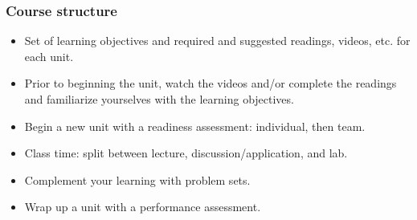 \documentclass[11pt]{beamer}
\begin{document}

\begin{frame}
\frametitle{Course structure}

\begin{itemize}[<alert@+>]
\item Set of learning objectives and required and suggested readings, videos, etc. for 
each unit.
\item Prior to beginning the unit, watch the videos and/or complete the readings and 
familiarize yourselves with the learning objectives.
\item Begin a new unit with a readiness assessment: individual, then team.
\item Class time: split between lecture, discussion/application, and lab.
\item Complement your learning with problem sets.
\item Wrap up a unit with a performance assessment.
\end{itemize}

\end{frame}
\end{document}
